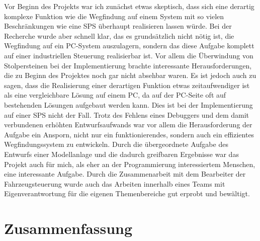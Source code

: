 	Vor Beginn des Projekts war ich zunächst etwas skeptisch, dass sich eine derartig komplexe Funktion wie die Wegfindung auf einem System mit so vielen Beschränkungen wie eine \ac{SPS} überhaupt realisieren lassen würde. Bei der Recherche wurde aber schnell klar, das es grundsätzlich nicht nötig ist, die Wegfindung auf ein PC-System auszulagern, sondern das diese Aufgabe komplett auf einer industriellen Steuerung realisierbar ist. Vor allem die Überwindung von Stolpersteinen bei der Implementierung brachte interessante Herausforderungen, die zu Beginn des Projektes noch gar nicht absehbar waren. Es ist jedoch auch zu sagen, dass die Realisierung einer derartigen Funktion etwas zeitaufwendiger ist als eine vergleichbare Lösung auf einem PC, da auf der PC-Seite oft auf bestehenden Lösungen aufgebaut werden kann. Dies ist bei der Implementierung auf einer \ac{SPS} nicht der Fall. Trotz des Fehlens eines Debuggers und dem damit verbundenen erhöhten Entwurfsaufwands war vor allem die Herausforderung der Aufgabe ein Ansporn, nicht nur ein funktionierendes, sondern auch ein effizientes Wegfindungssystem zu entwickeln. Durch die übergeordnete Aufgabe des Entwurfs einer Modellanlage und die dadurch greifbaren Ergebnisse war das Projekt auch für mich, als eher an der Programmierung interessiertem Menschen, eine interessante Aufgabe. Durch die Zusammenarbeit mit dem Bearbeiter der Fahrzeugsteuerung wurde auch das Arbeiten innerhalb eines Teams mit Eigenverantwortung für die eigenen Themenbereiche gut erprobt und bewältigt.

\section{Zusammenfassung}
	
